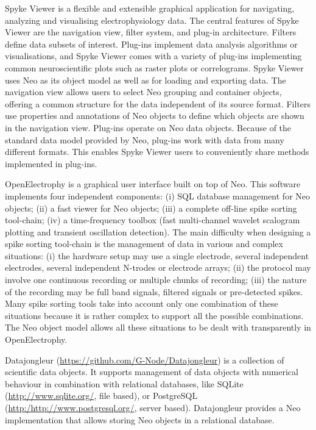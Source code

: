 \documentclass{frontiers}
\begin{document}
Spyke Viewer \citep{Proepper2013} is a flexible and extensible graphical application for navigating, analyzing and visualising electrophysiology data. 
The central features of Spyke Viewer are the navigation view, filter system, and plug-in architecture.
Filters define data subsets of interest.
Plug-ins implement data analysis algorithms or visualisations, and Spyke Viewer comes with a variety of plug-ins implementing common neuroscientific plots such as raster plots or correlograms.
Spyke Viewer uses Neo as its object model as well as for loading and exporting data. 
The navigation view allows users to select Neo grouping and container objects, offering a common structure for the data independent of its source format.
Filters use properties and annotations of Neo objects to define which objects are shown in the navigation view.
Plug-ins operate on Neo data objects. Because of the standard data model provided by Neo, plug-ins work with data from many different formats. This enables Spyke Viewer users to conveniently share methods implemented in plug-ins.

OpenElectrophy \citep{Garcia2009} is a graphical user interface built on top of Neo. This software implements four independent components:
   (i) SQL database management for Neo objects;
   (ii) a fast viewer for Neo objects;
   (iii) a complete off-line spike sorting tool-chain;
   (iv) a time-frequency toolbox (fast multi-channel wavelet scalogram plotting and transient oscillation detection).
The main difficulty when designing a spike sorting tool-chain is the management of data in various and complex situations: 
   (i) the hardware setup may use a single electrode, several independent electrodes, several independent N-trodes or electrode arrays;
   (ii) the protocol may involve one continuous recording or multiple chunks of recording;
   (iii) the nature of the recording may be full band signals, filtered signals or pre-detected spikes.
Many spike sorting tools take into account only one combination of these situations because it is rather complex to support all the possible combinations. The Neo object model allows all these situations to be dealt with transparently in OpenElectrophy.

Datajongleur (\url{https://github.com/G-Node/Datajongleur}) is a collection of
scientific data objects. It supports management of data objects with numerical
behaviour in combination with relational databases, like SQLite
(\url{http://www.sqlite.org/}, file based), or PostgreSQL
(\url{http:/http://www.postgresql.org/}, server based). Datajongleur provides
a Neo implementation that allows storing Neo objects in a relational database.
\end{document}
